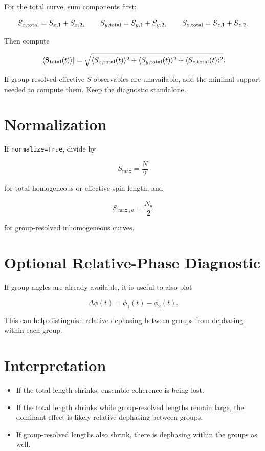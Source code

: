 \documentclass[11pt]{article}
\begin{document}
For the total curve, sum components first:

\begin{equation}
S_{x,\rm total}=S_{x,1}+S_{x,2},
\qquad
S_{y,\rm total}=S_{y,1}+S_{y,2},
\qquad
S_{z,\rm total}=S_{z,1}+S_{z,2}.
\end{equation}

Then compute

\begin{equation}
\left|\langle \mathbf S_{\rm total}(t)\rangle\right|
=
\sqrt{
\langle S_{x,\rm total}(t)\rangle^2+
\langle S_{y,\rm total}(t)\rangle^2+
\langle S_{z,\rm total}(t)\rangle^2
}.
\end{equation}

If group-resolved effective-\(S\) observables are unavailable, add the minimal support needed to compute them. Keep the diagnostic standalone.

\section*{Normalization}

If \texttt{normalize=True}, divide by

\begin{equation}
S_{\max}=\frac{N}{2}
\end{equation}

for total homogeneous or effective-spin length, and

\begin{equation}
S_{{\max},a}=\frac{N_a}{2}
\end{equation}

for group-resolved inhomogeneous curves.

\section*{Optional Relative-Phase Diagnostic}

If group angles are already available, it is useful to also plot

\begin{equation}
\Delta\phi(t)=\phi_1(t)-\phi_2(t).
\end{equation}

This can help distinguish relative dephasing between groups from dephasing within each group.

\section*{Interpretation}

\begin{itemize}
\item If the total length shrinks, ensemble coherence is being lost.
\item If the total length shrinks while group-resolved lengths remain large, the dominant effect is likely relative dephasing between groups.
\item If group-resolved lengths also shrink, there is dephasing within the groups as well.
\end{itemize}
\end{document}
